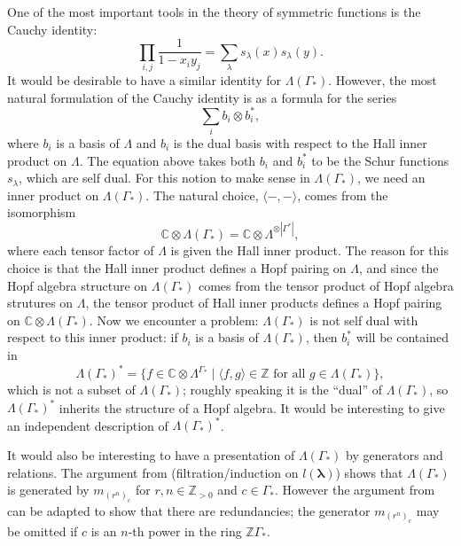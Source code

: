 \documentclass[ALCO,Unicode]{cedram}
\newcommand{\bs}{\boldsymbol}
\newcommand{\LambdaG}{\Lambda(\Gamma_*)}
\newcommand{\LambdaG}{\Lambda(\Gamma_*)}
\begin{document}
\begin{remark}
One of the most important tools in the theory of symmetric functions is the Cauchy identity:
\[
\prod_{i,j} \frac{1}{1-x_iy_j} = \sum_{\lambda} s_\lambda(x) s_\lambda(y).
\]
It would be desirable to have a similar identity for $\LambdaG$. However, the most natural formulation of the Cauchy identity is as a formula for the series
\[
\sum_i b_i \otimes b_i^*,
\]
where $b_i$ is a basis of $\Lambda$ and $b_i$ is the dual basis with respect to the Hall inner product on $\Lambda$. The equation above takes both $b_i$ and $b_i^*$ to be the Schur functions $s_\lambda$, which are self dual. For this notion to make sense in $\LambdaG$, we need an inner product on $\LambdaG$. The natural choice, $\langle -,- \rangle$, comes from the isomorphism
\[
\mathbb{C} \otimes \LambdaG = \mathbb{C} \otimes \Lambda^{\otimes |\Gamma^*|},
\]
where each tensor factor of $\Lambda$ is given the Hall inner product. The reason for this choice is that the Hall inner product defines a Hopf pairing on $\Lambda$, and since the Hopf algebra structure on $\LambdaG$ comes from the tensor product of Hopf algebra strutures on $\Lambda$, the tensor product of Hall inner products defines a Hopf pairing on $\mathbb{C} \otimes \LambdaG$. Now we encounter a problem: $\LambdaG$ is not self dual with respect to this inner product: if $b_i$ is a basis of $\LambdaG$, then $b_i^*$ will be contained in
\[
\LambdaG^* = \{f \in \mathbb{C} \otimes \Lambda^{\Gamma_*} \mid \langle f, g \rangle \in \mathbb{Z} \mbox{ for all $g \in \LambdaG$}\},
\]
which is not a subset of $\LambdaG$; roughly speaking it is the ``dual'' of $\LambdaG$, so $\LambdaG^*$ inherits the structure of a Hopf algebra. It would be interesting to give an independent description of $\LambdaG^*$.
\end{remark}

It would also be interesting to have a presentation of $\LambdaG$ by generators and relations. The argument from \cite[Corollary 2.3]{Vaccarino} (filtration/induction on $l(\bs\lambda)$) shows that $\LambdaG$ is generated by $m_{(r^n)_c}$ for $r,n \in \mathbb{Z}_{>0}$ and $c \in \Gamma_*$. However the argument from \cite[Proposition 2.5]{Vaccarino} can be adapted to show that there are redundancies; the generator $m_{(r^n)_c}$ may be omitted if $c$ is an $n$-th power in the ring $\mathbb{Z}\Gamma_*$.
\end{document}
